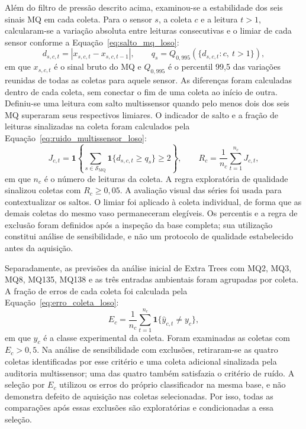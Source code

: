 Além do filtro de pressão descrito acima, examinou-se a estabilidade dos
seis sinais MQ em cada coleta. Para o sensor $s$, a coleta $c$ e a leitura
$t>1$, calcularam-se a variação absoluta entre leituras consecutivas e o
limiar de cada sensor conforme a Equação~\eqref{eq:salto_mq_loso}:
\begin{equation}
    d_{s,c,t}=\left|x_{s,c,t}-x_{s,c,t-1}\right|,
    \qquad
    q_s=Q_{0{,}995}\!\left(\{d_{s,c,t}:c,\ t>1\}\right),
    \label{eq:salto_mq_loso}
\end{equation}
em que $x_{s,c,t}$ é o sinal bruto do MQ e $Q_{0{,}995}$ é o percentil
99,5 das variações reunidas de todas as coletas para aquele sensor.
As diferenças foram calculadas dentro de cada coleta, sem conectar o fim
de uma coleta ao início de outra. Definiu-se uma leitura com salto
multissensor quando pelo menos dois dos seis MQ superaram seus respectivos
limiares. O indicador de salto e a fração de leituras sinalizadas na coleta
foram calculados pela Equação~\eqref{eq:ruido_multissensor_loso}:
\begin{equation}
    J_{c,t}=\mathbf{1}\!\left\{
      \sum_{s\in\mathcal{S}_{\mathrm{MQ}}}
      \mathbf{1}\{d_{s,c,t}\geq q_s\}\geq 2
    \right\},
    \qquad
    R_c=\frac{1}{n_c}\sum_{t=1}^{n_c}J_{c,t},
    \label{eq:ruido_multissensor_loso}
\end{equation}
em que $n_c$ é o número de leituras da coleta. A regra exploratória de
qualidade sinalizou coletas com $R_c\geq 0{,}05$. A avaliação visual das
séries foi usada para contextualizar os saltos. O limiar foi aplicado à
coleta individual, de forma que as demais coletas do mesmo vaso permaneceram
elegíveis. Os percentis e a regra de exclusão foram definidos após a
inspeção da base completa; sua utilização constitui análise de
sensibilidade, e não um protocolo de qualidade estabelecido antes da
aquisição.

Separadamente, as previsões da análise inicial de Extra Trees com MQ2,
MQ3, MQ8, MQ135, MQ138 e as três entradas ambientais foram agrupadas por
coleta. A fração de erros de cada coleta foi calculada pela
Equação~\eqref{eq:erro_coleta_loso}:
\begin{equation}
    E_c=\frac{1}{n_c}\sum_{t=1}^{n_c}
    \mathbf{1}\{\widehat y_{c,t}\neq y_c\},
    \label{eq:erro_coleta_loso}
\end{equation}
em que $y_c$ é a classe experimental da coleta. Foram examinadas as
coletas com $E_c>0{,}5$. Na análise de sensibilidade com exclusões,
retiraram-se as quatro coletas identificadas por esse critério e uma
coleta adicional sinalizada pela auditoria multissensor; uma das quatro
também satisfazia o critério de ruído. A seleção por $E_c$ utilizou os
erros do próprio classificador na mesma base, e não demonstra defeito de
aquisição nas coletas selecionadas. Por isso, todas as comparações após
essas exclusões são exploratórias e condicionadas a essa seleção.

